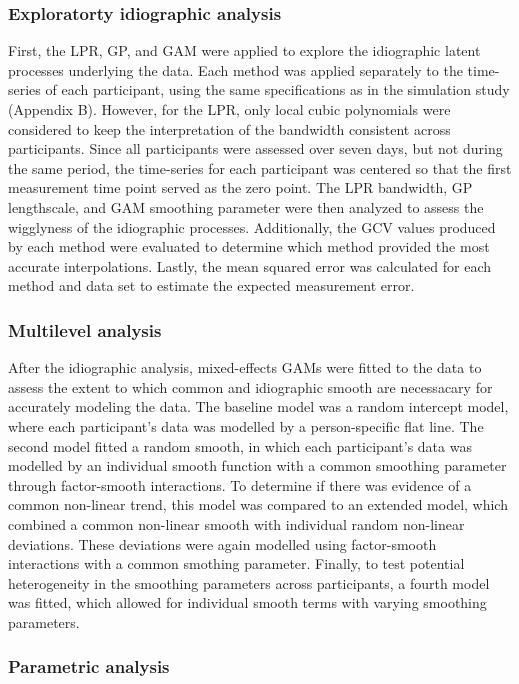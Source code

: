 \documentclass[man, floatsintext]{apa7}
\begin{document}
\subsubsection{Exploratorty idiographic analysis}

First, the LPR, GP, and GAM were applied to explore the idiographic
latent processes underlying the data. Each method was applied separately to the
time-series of each participant, using the same specifications as in the
simulation study (Appendix B). However, for the LPR, only local cubic
polynomials were
considered to keep the interpretation of the bandwidth consistent across
participants.
Since all participants were assessed over seven days, but not during the same
period, the time-series for each participant was centered so that the first
measurement time point served as the zero point. The LPR bandwidth, GP
lengthscale, and GAM smoothing parameter were then analyzed to assess the
wigglyness of the idiographic processes. Additionally, the GCV values produced
by each method were evaluated to determine which method provided the most
accurate interpolations. Lastly, the mean squared error was calculated for each
method and data set to estimate the expected measurement error.

\subsubsection{Multilevel analysis}

After the idiographic analysis, mixed-effects GAMs were fitted to the data to
assess the extent to which common and idiographic smooth are necessacary for
accurately modeling the data. The baseline model was a random intercept model,
where each participant's data was modelled by a person-specific flat line.
The second model fitted a random smooth, in which each participant's data
was modelled by an individual smooth function with a common smoothing parameter
through factor-smooth interactions. To determine if there was evidence of a
common non-linear trend, this model was compared to an extended model,
which combined a common non-linear smooth with individual random non-linear
deviations. These deviations were again modelled using factor-smooth
interactions with a common smothing parameter. Finally, to test
potential heterogeneity in the smoothing parameters across participants,
a fourth model was fitted, which allowed for individual smooth terms with
varying smoothing parameters.

\subsubsection{Parametric analysis}
\end{document}
